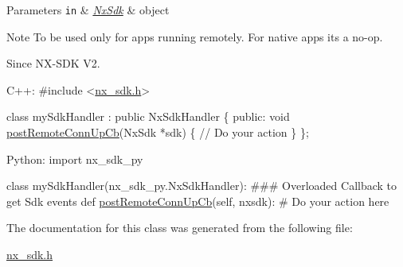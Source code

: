 \begin{DoxyParams}[1]{Parameters}
\mbox{\tt in}  & {\em \mbox{\hyperlink{classnxos_1_1_nx_sdk}{Nx\+Sdk}}} & object\\
\hline
\end{DoxyParams}
\begin{DoxyNote}{Note}
To be used only for apps running remotely. For native apps its a no-\/op.
\end{DoxyNote}
\begin{DoxySince}{Since}
N\+X-\/\+S\+DK V2. ~\newline
 
\begin{DoxyCode}
C++:                                                                                  
\textcolor{preprocessor}{   #include <\mbox{\hyperlink{nx__sdk_8h}{nx\_sdk.h}}>}                                          
                                                                            
   \textcolor{keyword}{class }mySdkHandler : \textcolor{keyword}{public} NxSdkHandler \{               
      \textcolor{keyword}{public}:                                           
         \textcolor{keywordtype}{void} \mbox{\hyperlink{classnxos_1_1_nx_sdk_handler_a71b575abab99f8798635035986dbdc3f}{postRemoteConnUpCb}}(NxSdk *sdk) \{         
              \textcolor{comment}{// Do your action                        }
         \}                                               
   \};                                                         
                                                              
Python:                                                     
   \textcolor{keyword}{import} nx\_sdk\_py                                                 
                                                                           
   \textcolor{keyword}{class }mySdkHandler(nx\_sdk\_py.NxSdkHandler):              
\textcolor{preprocessor}{   ### Overloaded Callback to get Sdk events                        }
         def \mbox{\hyperlink{classnxos_1_1_nx_sdk_handler_a71b575abab99f8798635035986dbdc3f}{postRemoteConnUpCb}}(self, nxsdk):                       
\textcolor{preprocessor}{             # Do your action here                              }
\end{DoxyCode}
 
\end{DoxySince}


The documentation for this class was generated from the following file\+:\begin{DoxyCompactItemize}
\item 
\mbox{\hyperlink{nx__sdk_8h}{nx\+\_\+sdk.\+h}}\end{DoxyCompactItemize}
